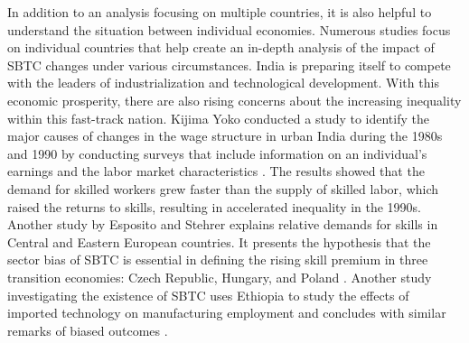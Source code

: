In addition to an analysis focusing on multiple countries, it is also helpful to understand the situation between individual economies. Numerous studies focus on individual countries that help create an in-depth analysis of the impact of SBTC changes under various circumstances. India is preparing itself to compete with the leaders of industrialization and technological development. With this economic prosperity, there are also rising concerns about the increasing inequality within this fast-track nation. Kijima Yoko conducted a study to identify the major causes of changes in the wage structure in urban India during the 1980s and 1990 by conducting surveys that include information on an individual's earnings and the labor market characteristics \cite{kijima2006did}. The results showed that the demand for skilled workers grew faster than the supply of skilled labor, which raised the returns to skills, resulting in accelerated inequality in the 1990s. Another study by Esposito and Stehrer explains relative demands for skills in Central and Eastern European countries. It presents the hypothesis that the sector bias of SBTC is essential in defining the rising skill premium in three transition economies: Czech Republic, Hungary, and Poland \cite{esposito2009sector}. Another study investigating the existence of SBTC uses Ethiopia to study the effects of imported technology on manufacturing employment and concludes with similar remarks of biased outcomes \cite{haile2017imported}.

